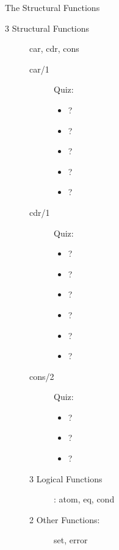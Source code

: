 \documentclass[fleqn]{beamer}
\begin{document}
\begin{frame}{The Structural Functions}
\begin{description}
  \item[3 Structural Functions] car, cdr, cons
    \begin{description}
      \item[car/1] Quiz:
        \begin{itemize}
          \item {}?
          \item {}?
          \item {}?
          \item {}?
          \item {}?
        \end{itemize}
      \item[cdr/1] Quiz:
        \begin{itemize}
          \item {}?
          \item {}?
          \item {}?
          \item {}?
          \item {}?
          \item {}?
        \end{itemize}
      \item[cons/2] Quiz:
        \begin{itemize}
          \item {}?
          \item {}?
          \item {}?
        \end{itemize}
      \item[3 Logical Functions]: atom, eq, cond
      \item[2 Other Functions:] set, error
    \end{description}
\end{description}
\end{frame}
\end{document}
